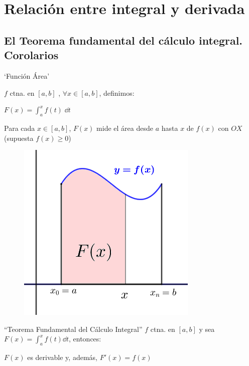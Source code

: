 \section{Relación entre integral y derivada}
\subsection{El Teorema fundamental del cálculo integral. Corolarios}

\begin{multicols}{2}
\begin{defi} `Función Área'

$f$ ctna. en $[a,b]$ , $\forall x \in [a,b]$, definimos:

$F(x)=\displaystyle \int_a^x f(t)\; \dd t$

Para cada $x \in [a,b]$, $F(x)$ mide el área desde $a$ hasta $x$ de $f(x)$ con $OX$ (supuesta $f(x)\ge 0$)
\begin{figure}[H]
 	\centering
	\includegraphics[width=.35\textwidth]{imagenes/imagenes08/T08IM08.png}
\end{figure}	
\end{defi}
\end{multicols}

\begin{teor} {``Teorema Fundamental del Cálculo Integral''}
\label{TFCI}
	$f$ ctna. en $[a,b]$ y sea $\displaystyle F(x)=\int_a^x f(t) \dd t$, entonces:

\hspace{25mm} $F(x)$ es derivable y, además, $F'(x)=f(x)$
\end{teor}

